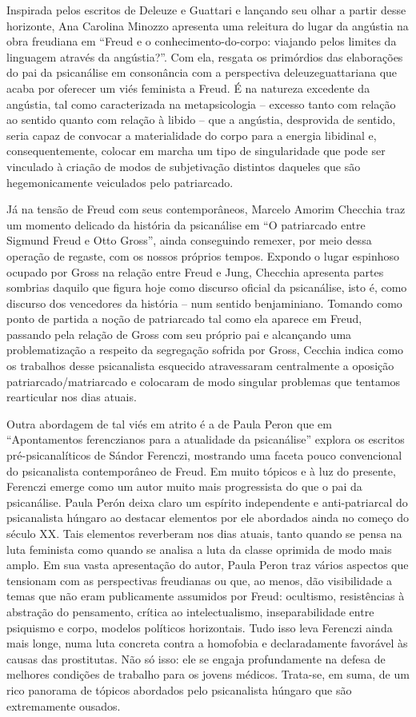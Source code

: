 Inspirada pelos escritos de Deleuze e Guattari e lançando seu olhar a
partir desse horizonte, Ana Carolina Minozzo apresenta uma releitura do
lugar da angústia na obra freudiana em ``Freud e o
conhecimento-do-corpo: viajando pelos limites da linguagem através da
angústia?''. Com ela, resgata os primórdios das elaborações do pai da
psicanálise em consonância com a perspectiva deleuzeguattariana que
acaba por oferecer um viés feminista a Freud. É na natureza excedente da
angústia, tal como caracterizada na metapsicologia -- excesso tanto com
relação ao sentido quanto com relação à libido -- que a angústia,
desprovida de sentido, seria capaz de convocar a materialidade do corpo
para a energia libidinal e, consequentemente, colocar em marcha um tipo
de singularidade que pode ser vinculado à criação de modos de
subjetivação distintos daqueles que são hegemonicamente veiculados pelo
patriarcado.

Já na tensão de Freud com seus contemporâneos, Marcelo Amorim Checchia
traz um momento delicado da história da psicanálise em ``O patriarcado
entre Sigmund Freud e Otto Gross'', ainda conseguindo remexer, por meio
dessa operação de regaste, com os nossos próprios tempos. Expondo o
lugar espinhoso ocupado por Gross na relação entre Freud e Jung,
Checchia apresenta partes sombrias daquilo que figura hoje como discurso
oficial da psicanálise, isto é, como discurso dos vencedores da história
-- num sentido benjaminiano. Tomando como ponto de partida a noção de
patriarcado tal como ela aparece em Freud, passando pela relação de
Gross com seu próprio pai e alcançando uma problematização a respeito da
segregação sofrida por Gross, Cecchia indica como os trabalhos desse
psicanalista esquecido atravessaram centralmente a oposição
patriarcado/matriarcado e colocaram de modo singular problemas que
tentamos rearticular nos dias atuais.

Outra abordagem de tal viés em atrito é a de Paula Peron que em
``Apontamentos ferenczianos para a atualidade da psicanálise'' explora
os escritos pré-psicanalíticos de Sándor Ferenczi, mostrando uma faceta
pouco convencional do psicanalista contemporâneo de Freud. Em muito
tópicos e à luz do presente, Ferenczi emerge como um autor muito mais
progressista do que o pai da psicanálise. Paula Perón deixa claro um
espírito independente e anti-patriarcal do psicanalista húngaro ao
destacar elementos por ele abordados ainda no começo do século XX. Tais
elementos reverberam nos dias atuais, tanto quando se pensa na luta
feminista como quando se analisa a luta da classe oprimida de modo mais
amplo. Em sua vasta apresentação do autor, Paula Peron traz vários
aspectos que tensionam com as perspectivas freudianas ou que, ao menos,
dão visibilidade a temas que não eram publicamente assumidos por Freud:
ocultismo, resistências à abstração do pensamento, crítica ao
intelectualismo, inseparabilidade entre psiquismo e corpo, modelos
políticos horizontais. Tudo isso leva Ferenczi ainda mais longe, numa
luta concreta contra a homofobia e declaradamente favorável às causas
das prostitutas. Não só isso: ele se engaja profundamente na defesa de
melhores condições de trabalho para os jovens médicos. Trata-se, em
suma, de um rico panorama de tópicos abordados pelo psicanalista húngaro
que são extremamente ousados.

